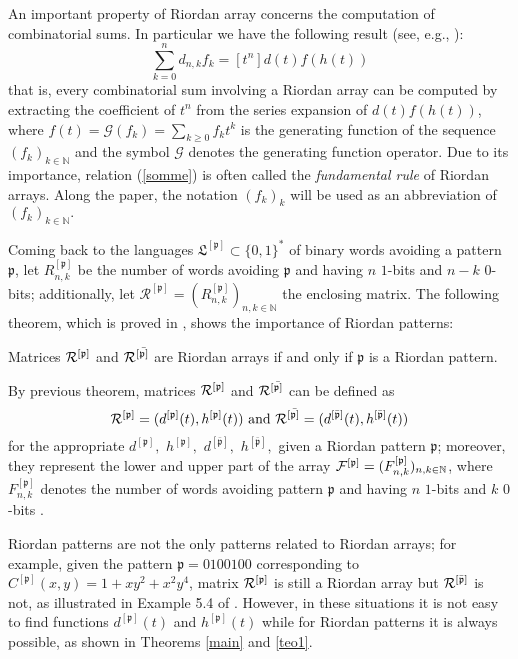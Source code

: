 An important property of Riordan array concerns the computation of
combinatorial sums.  In particular we have the following result (see, e.g.,
\citep{LUZON2012631,Merlini:2009:CSI:2653507.2654195,SPRUGNOLI1994267}):
\begin{equation}
    \label{somme}
    \sum_{k=0}^n d_{n,k}f_k=[t^n]d(t)f(h(t))
\end{equation}
that is, every combinatorial sum involving a Riordan array can be computed by
extracting the coefficient of $t^n$ from the series expansion of $d(t)f(h(t))$,
where $f(t)=\mathcal{G}(f_k)=\sum_{k\geq 0}f_kt^k$ is the generating function of the
sequence $(f_k)_{k \in\mathbb{N}}$ and the symbol $\mathcal{G}$ denotes the generating function
operator. Due to its importance, relation (\ref{somme}) is often called the
\textit{fundamental rule} of Riordan arrays.  Along the paper, the notation
$(f_k)_{k}$ will be used as an abbreviation of $(f_k)_{k\in\mathbb{N}}.$

Coming back to the languages $\mathfrak{L}^{[\mathfrak{p}]}\subset \{0,1\}^*$
of binary words avoiding a pattern $\mathfrak{p}$, let
$R_{n,k}^{[\mathfrak{p}]}$ be the number of words avoiding $\mathfrak{p}$ and
having $n$ $1$-bits  and $n-k$  $0$-bits; additionally, let
$\mathcal{R}^{[\mathfrak{p}]}=\left(R_{n,k}^{[\mathfrak{p}]}\right)_{n,k\in\mathbb{N}}$
the enclosing matrix. The following theorem, which is proved in \citep{MERLINI20112988},
shows the importance of Riordan patterns:
\begin{theorem}
\label{main}
Matrices ${\cal{R}^{[\mathfrak{p}]}}$ and ${\cal{R}^{[\bar{\mathfrak{p}]}}}$
are Riordan arrays if and only if  $\mathfrak{p}$ is a Riordan pattern.
\end{theorem}

By previous theorem, matrices ${\cal{R}^{[\mathfrak{p}]}}$ and
${\cal{R}^{[\bar{\mathfrak{p}]}}}$ can be defined as
$${\cal{R}^{[\mathfrak{p}]}}=(d^{[\mathfrak{p}]}(t),h^{[\mathfrak{p}]}(t)) \text{ and }
{\cal{R}^{[\bar{\mathfrak{p}]}}}=(d^{[\bar{\mathfrak{p}}]}(t),h^{[\bar{\mathfrak{p}}]}(t))$$
for the appropriate $d^{[\mathfrak{p}]},$ $h^{[\mathfrak{p}]},$ $d^{[\bar{\mathfrak{p}}]},$
$h^{[\bar{\mathfrak{p}}]},$ given a Riordan pattern $\mathfrak{p}$; moreover, they represent the lower and
upper part of the array
${\cal{F}^{[\mathfrak{p}]}}=(F_{n,k}^{[\mathfrak{p}]})_{n,k \in \mathbb{N}}$,
where $F_{n,k}^{[\mathfrak{p}]}$ denotes the number of words avoiding pattern
$\mathfrak{p}$ and having $n$ $1$-bits  and $k$ $0$-bits .


\begin{remark}
 Riordan patterns are not the only patterns related to Riordan arrays; for
 example, given the pattern $\mathfrak{p}=0100100$ corresponding to
 $C^{[\mathfrak{p}]}(x,y)=1+xy^2+x^2y^4$, matrix ${\cal{R}^{[\mathfrak{p}]}}$
 is still a Riordan array but ${\cal{R}^{[\bar{\mathfrak{p}}]}}$
is not, as illustrated in Example 5.4 of \citep{Baccherini2007BinaryWE}. However, in these
situations it is not easy to find functions $d^{[\mathfrak{p}]}(t)$ and
$h^{[\mathfrak{p}]}(t)$ while for Riordan patterns it is always possible, as
shown in Theorems \ref{main} and \ref{teo1}.
\end{remark}


